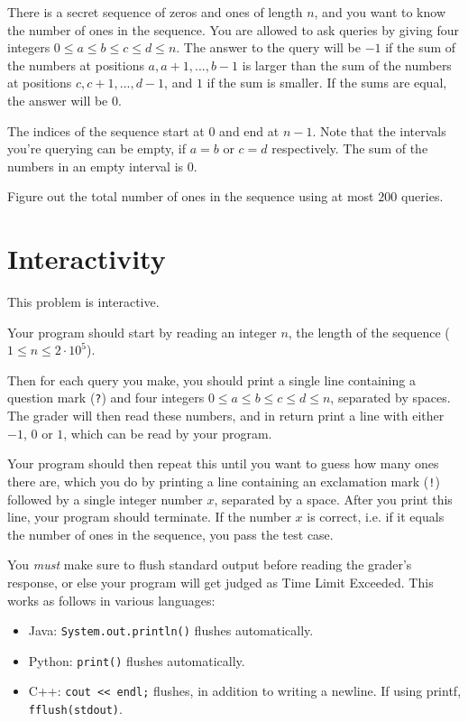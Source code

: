 There is a secret sequence of zeros and ones of length $n$, and you want to know the number of ones in the sequence.
You are allowed to ask queries by giving four integers $0 \leq a \leq b \leq c \leq d \leq n$.
The answer to the query will be $-1$ if the sum of the numbers at positions $a, a+1, ..., b-1$ is larger than the
sum of the numbers at positions $c, c+1, ..., d-1$, and $1$ if the sum is smaller.
If the sums are equal, the answer will be $0$.

The indices of the sequence start at $0$ and end at $n-1$.
Note that the intervals you're querying can be empty, if $a = b$ or $c = d$ respectively.
The sum of the numbers in an empty interval is $0$.

Figure out the total number of ones in the sequence using at most $200$ queries.

\section*{Interactivity}
This problem is interactive.

Your program should start by reading an integer $n$, the length of the sequence ($1 \le n \le 2 \cdot 10^5$).

Then for each query you make, you should print a single line containing a question mark (\texttt{?}) and
four integers $0 \leq a \leq b \leq c \leq d \leq n$, separated by spaces.
The grader will then read these numbers, and in return print a line with either $-1$, $0$ or $1$, which can be read by your program.

Your program should then repeat this until you want to guess how many ones there are,
which you do by printing a line containing an exclamation mark (\texttt{!}) followed by a single integer number $x$, separated by a space.
After you print this line, your program should terminate.
If the number $x$ is correct, i.e. if it equals the number of ones in the sequence, you pass the test case.

You \emph{must} make sure to flush standard output before reading the grader's response, or else your program
will get judged as Time Limit Exceeded. This works as follows in various languages:
\begin{itemize}
  \item Java: \texttt{System.out.println()} flushes automatically.
  \item Python: \texttt{print()} flushes automatically.
  \item C++: \texttt{cout <{}< endl;} flushes, in addition to writing a newline. If using printf, \texttt{fflush(stdout)}.
\end{itemize}


